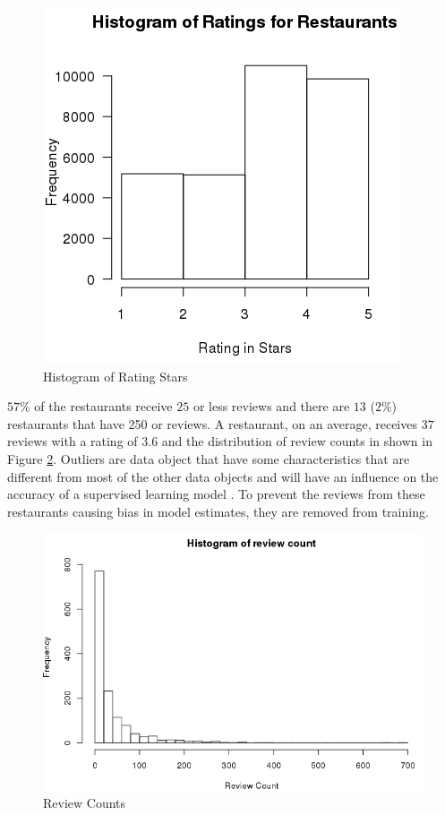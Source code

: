 \documentclass[12pt]{article}
\begin{document}
\begin{figure}[h]
	\centering
	\includegraphics[width=0.7\linewidth]{hist_review_stars}
	\caption{Histogram of Rating Stars}
	\label{fig:hist_review_stars}
\end{figure}

$57\%$ of the restaurants receive $25$ or less reviews and there are $13$ ($2\%$) restaurants that have 250 or reviews. A restaurant, on an average, receives $37$ reviews with a rating of $3.6$ and the distribution of review counts in shown in Figure \ref{fig:histogram_review_count}. Outliers are data object that have some characteristics that are different from most of the other data objects and will have an influence on the accuracy of a supervised learning model \cite{rousseeuv}. To prevent the reviews from these restaurants causing bias in model estimates, they are removed from training.

\begin{figure}[h]
\centering
\includegraphics[width=0.7\linewidth]{histogram_review_count}
\caption{Review Counts}
\label{fig:histogram_review_count}
\end{figure}
\end{document}
